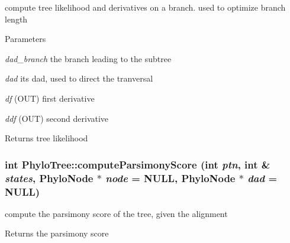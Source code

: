 \label{classPhyloTree_a1c21d2ba4fc8755b3435b5677938a0fb}
compute tree likelihood and derivatives on a branch. used to optimize branch length 
\begin{DoxyParams}{Parameters}
\item[{\em dad\_\-branch}]the branch leading to the subtree \item[{\em dad}]its dad, used to direct the tranversal \item[{\em df}](OUT) first derivative \item[{\em ddf}](OUT) second derivative \end{DoxyParams}
\begin{DoxyReturn}{Returns}
tree likelihood 
\end{DoxyReturn}
\hypertarget{classPhyloTree_a43540029a0627fb2736464a7def1f846}{
\subsubsection[{computeParsimonyScore}]{\setlength{\rightskip}{0pt plus 5cm}int PhyloTree::computeParsimonyScore (int {\em ptn}, \/  int \& {\em states}, \/  {\bf PhyloNode} $\ast$ {\em node} = {\ttfamily NULL}, \/  {\bf PhyloNode} $\ast$ {\em dad} = {\ttfamily NULL})}}
\label{classPhyloTree_a43540029a0627fb2736464a7def1f846}
compute the parsimony score of the tree, given the alignment \begin{DoxyReturn}{Returns}
the parsimony score 
\end{DoxyReturn}

